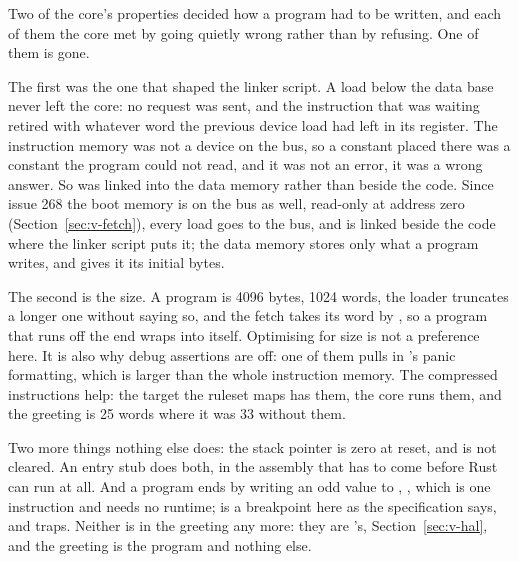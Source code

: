 \documentclass[journal,onecolumn,9pt]{IEEEtran}
\begin{document}
Two of the core's properties decided how a program had to be
written, and each of them the core met by going quietly wrong rather
than by refusing. One of them is gone.

The first was the one that shaped the linker script. A load below the
data base never left the core: no request was sent, and the
instruction that was waiting retired with whatever word the previous
device load had left in its register. The instruction memory was not
a device on the bus, so a constant placed there was a constant the
program could not read, and it was not an error, it was a wrong
answer. So  was linked into the data memory rather than
beside the code. Since issue 268 the boot memory is on the bus as
well, read-only at address zero (Section~\ref{sec:v-fetch}), every
load goes to the bus, and  is linked beside the code
where the linker script puts it; the data memory stores only what a
program writes, and  gives it its initial bytes.

The second is the size. A program is 4096 bytes, 1024 words, the
loader truncates a longer one without saying so, and the fetch takes
its word by , so a program that runs off the end wraps
into itself. Optimising for size is not a preference here. It is also why
debug assertions are off: one of them pulls in 's panic
formatting, which is larger than the whole instruction memory. The
compressed instructions help: the target the ruleset maps has them,
the core runs them, and the greeting is 25 words where it was 33
without them.

Two more things nothing else does: the stack pointer is zero at
reset, and  is not cleared. An entry stub does both, in
the assembly that has to come before Rust can run at all. And a
program ends by writing an odd value to ,
, which is one instruction and needs no runtime;
 is a breakpoint here as the specification says, and
traps. Neither is in the greeting any more: they are
's, Section~\ref{sec:v-hal}, and the greeting is
the program and nothing else.




\end{document}
